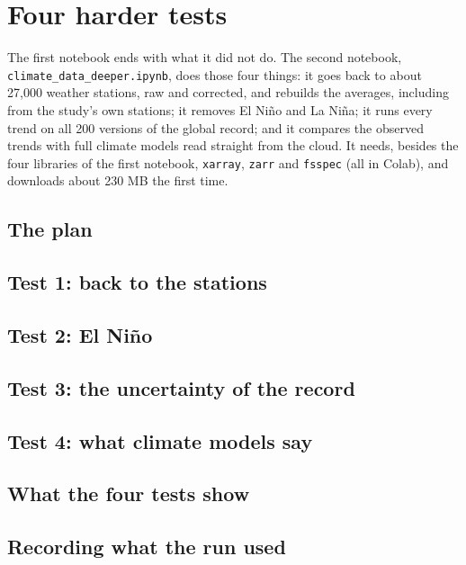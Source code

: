 \chapter{Four harder tests}\label{ch:deeper}

The first notebook ends with what it did not do. The second notebook, \texttt{climate\_data\_deeper.ipynb}, does those
four things: it goes back to about 27,000 weather stations, raw and corrected, and rebuilds the averages, including
from the study's own stations; it removes El Ni\~no and La Ni\~na; it runs every trend on all 200 versions of the global
record; and it compares the observed trends with full climate models read straight from the cloud. It needs, besides
the four libraries of the first notebook, \texttt{xarray}, \texttt{zarr} and \texttt{fsspec} (all in Colab), and
downloads about 230 MB the first time.

\section{The plan}

\section{Test 1: back to the stations}

\section{Test 2: El Ni\~no}

\section{Test 3: the uncertainty of the record}

\section{Test 4: what climate models say}

\section{What the four tests show}

\section{Recording what the run used}


